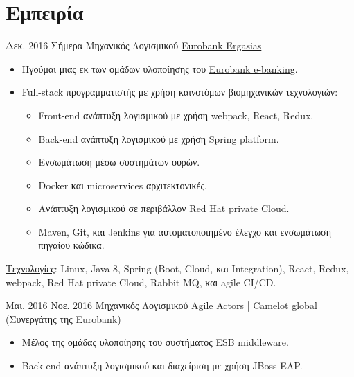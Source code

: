 \documentclass[letterpaper]{style/twentysecondcv} %
\begin{document}
\vspace{1.0em}


\section{Εμπειρία}

\begin{twenty}
	\twentyplusitem
		{Δεκ. 2016}
		{\phantom{ } \phantom{ }Σήμερα}
		{Μηχανικός Λογισμικού}
		{\href{https://www.eurobank.gr/en/group}{Eurobank Ergasias}}
		{}
		{%
			\begin{itemize}
				\item Ηγούμαι μιας εκ των ομάδων υλοποίησης του \href{https://ebanking.eurobank.gr}{Eurobank e-banking}.
				\item Full-stack προγραμματιστής με χρήση καινοτόμων βιομηχανικών τεχνολογιών:
				\begin{itemize}
					\item Front-end ανάπτυξη λογισμικού με χρήση webpack, React, Redux.
					\item Back-end ανάπτυξη λογισμικού με χρήση Spring platform.
					\item Ενσωμάτωση μέσω συστημάτων ουρών.
					\item Docker και microservices αρχιτεκτονικές.
					\item Ανάπτυξη λογισμικού σε περιβάλλον Red Hat private Cloud.
					\item Maven, Git, και Jenkins για αυτοματοποιημένο έλεγχο και ενσωμάτωση πηγαίου κώδικα.
				\end{itemize}
			\end{itemize}
			\vspace{0.5em}
			\underline{Τεχνολογίες}: Linux, Java 8, Spring (Boot, Cloud, και Integration), React, Redux, webpack, Red Hat private Cloud, Rabbit MQ, και agile CI/CD.
			\vspace{1.0em}
		}
	\twentyplusitem
		{Μαι. 2016}
		{Νοε. 2016}
		{Μηχανικός Λογισμικού}
		{\href{https://www.agileactors.com/}{Agile Actors | Camelot global} (Συνεργάτης της \href{https://www.eurobank.gr/en/group}{Eurobank})}
		{}
		{%
			\begin{itemize}
				\item Μέλος της ομάδας υλοποίησης του συστήματος ESB middleware.
				\item Back-end ανάπτυξη λογισμικού και διαχείριση με χρήση JBoss EAP.

\end{itemize}}
\end{twenty}
\end{document}
